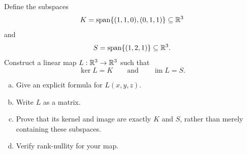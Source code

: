 \begin{exercise}
  \label{ex:hw04:prescribed-kernel-and-image}
  Define the subspaces
  \[
    K=\operatorname{span}\{(1,1,0),(0,1,1)\}\subseteq\mathbb{R}^3
  \]
  and
  \[
    S=\operatorname{span}\{(1,2,1)\}\subseteq\mathbb{R}^3.
  \]
  Construct a linear map \(L:\mathbb{R}^3\to\mathbb{R}^3\) such that
  \[
    \ker L=K\qquad\text{and}\qquad\operatorname{im}L=S.
  \]
  \begin{enumerate}[(a)][2]
    \item Give an explicit formula for \(L(x,y,z)\).
    \item Write \(L\) as a matrix.
    \item Prove that its kernel and image are exactly \(K\) and \(S\),
      rather than merely containing these subspaces.
    \item Verify rank-nullity for your map.
  \end{enumerate}
\end{exercise}
